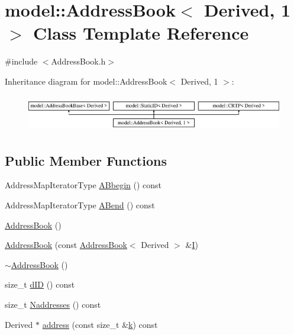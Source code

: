 \hypertarget{classmodel_1_1_address_book_3_01_derived_00_011_01_4}{}\section{model\+:\+:Address\+Book$<$ Derived, 1 $>$ Class Template Reference}
\label{classmodel_1_1_address_book_3_01_derived_00_011_01_4}


{\ttfamily \#include $<$Address\+Book.\+h$>$}

Inheritance diagram for model\+:\+:Address\+Book$<$ Derived, 1 $>$\+:\begin{figure}[H]
\begin{center}
\leavevmode
\includegraphics[height=1.616162cm]{classmodel_1_1_address_book_3_01_derived_00_011_01_4}
\end{center}
\end{figure}
\subsection*{Public Member Functions}
\begin{DoxyCompactItemize}
\item 
Address\+Map\+Iterator\+Type \hyperlink{classmodel_1_1_address_book_3_01_derived_00_011_01_4_aef9065565a308b2fbd1a95bf987be2d6}{A\+Bbegin} () const 
\item 
Address\+Map\+Iterator\+Type \hyperlink{classmodel_1_1_address_book_3_01_derived_00_011_01_4_a856a755cd959ba854553f8f8636c22d7}{A\+Bend} () const 
\item 
\hyperlink{classmodel_1_1_address_book_3_01_derived_00_011_01_4_a54458c4da5c8e1990f453336c5211ce4}{Address\+Book} ()
\item 
\hyperlink{classmodel_1_1_address_book_3_01_derived_00_011_01_4_ae1e3fe182a39764548538a5e3f1354ca}{Address\+Book} (const \hyperlink{classmodel_1_1_address_book}{Address\+Book}$<$ Derived $>$ \&\hyperlink{_cubic_spline_intersection_8m_a0c7a5a4978fb47e4ffba1c5fdd542c4d}{I})
\item 
\hyperlink{classmodel_1_1_address_book_3_01_derived_00_011_01_4_a148028422f91fa4ff709c5a1983c1bf9}{$\sim$\+Address\+Book} ()
\item 
size\+\_\+t \hyperlink{classmodel_1_1_address_book_3_01_derived_00_011_01_4_a680cc0aaa442e4c89a50a3a43d46b550}{d\+I\+D} () const 
\item 
size\+\_\+t \hyperlink{classmodel_1_1_address_book_3_01_derived_00_011_01_4_a138858bd7608314f2fad28993bc24c28}{Naddresses} () const 
\item 
Derived $\ast$ \hyperlink{classmodel_1_1_address_book_3_01_derived_00_011_01_4_abcf7b193923b49450c58be7c935ffd24}{address} (const size\+\_\+t \&\hyperlink{_f_e_m_2linear__elasticity__3d_2tetgen_2generate_p_o_l_ycube_8m_a5d2aad4440da75aa43f2643e72b1a3bd}{k}) const 
\end{DoxyCompactItemize}
